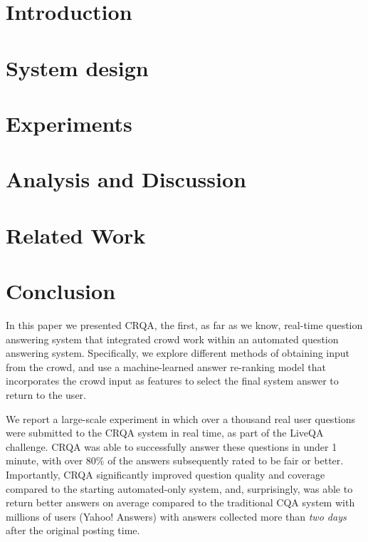 \documentclass[letterpaper]{article}
\begin{document}
\section{Introduction}
\label{sec:introduction}


\section{System design}
\label{sec:system}


\section{Experiments}
\label{sec:experiments}


\section{Analysis and Discussion}
\label{sec:analysis}


\section{Related Work}
\label{sec:related_work}


\section{Conclusion} 
In this paper we presented CRQA, the first, as far as we know, real-time question answering system that integrated crowd work within an automated question answering system.
Specifically, we explore different methods of obtaining input from the crowd, and use a machine-learned answer re-ranking model that incorporates the crowd input as features to select the final system answer to return to the user. 

We report a large-scale experiment in which over a thousand real user questions were submitted to the CRQA system in real time, as part of the LiveQA challenge.
CRQA was able to successfully answer these questions in under 1 minute, with over 80\% of the answers subsequently rated to be fair or better.
Importantly, CRQA significantly improved question quality and coverage compared to the starting automated-only system, and, surprisingly, was able to return better answers on average compared to the traditional CQA system with millions of users (Yahoo! Answers) with answers collected more than \textit{two days} after the original posting time.
\end{document}
